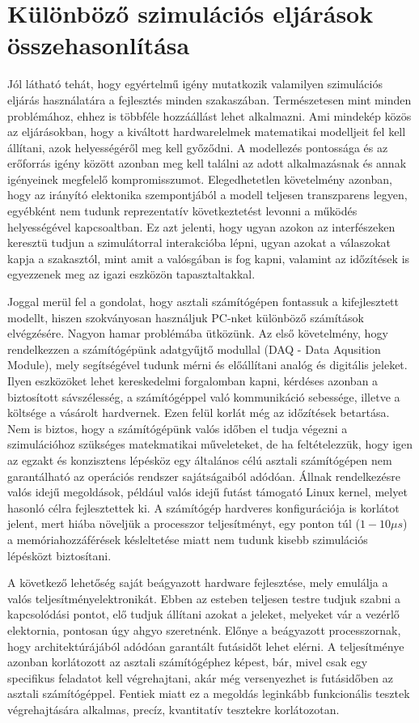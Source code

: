 \section{Különböző szimulációs eljárások összehasonlítása}

Jól látható tehát, hogy egyértelmű igény mutatkozik valamilyen szimulációs eljárás használatára a fejlesztés minden szakaszában. Természetesen mint minden problémához, ehhez is többféle hozzáállást lehet alkalmazni. Ami mindekép közös az eljárásokban, hogy a kiváltott hardwarelelmek matematikai modelljeit fel kell állítani, azok helyességéről meg kell győződni. A modellezés pontossága és az erőforrás igény között azonban meg kell találni az adott alkalmazásnak és annak igényeinek megfelelő kompromisszumot. Elegedhetetlen követelmény azonban, hogy az irányító elektonika szempontjából a modell teljesen transzparens legyen, egyébként nem tudunk reprezentatív következtetést levonni a működés helyességével kapcsoaltban. Ez azt jelenti, hogy ugyan azokon az interfészeken keresztü tudjun a szimulátorral interakcióba lépni, ugyan azokat a válaszokat kapja a szakasztól, mint amit a valósgában is fog kapni, valamint az időzítések is egyezzenek meg az igazi eszközön tapasztaltakkal.

Joggal merül fel a gondolat, hogy asztali számítógépen fontassuk a kifejlesztett modellt, hiszen szokványosan használjuk PC-nket különböző számítások elvégzésére. Nagyon hamar problémába ütközünk. Az első követelmény, hogy rendelkezzen a számítógépünk adatgyűjtő modullal (DAQ - Data Aqusition Module), mely segítségével tudunk mérni és előállítani analóg és digitális jeleket. Ilyen eszközöket lehet kereskedelmi forgalomban kapni, kérdéses azonban a biztosított sávszélesség, a számítógéppel való kommunikáció sebessége, illetve a költsége a vásárolt hardvernek. Ezen felül korlát még az időzítések betartása. Nem is biztos, hogy a számítógépünk valós időben el tudja végezni a szimulációhoz szükséges matekmatikai műveleteket, de ha feltételezzük, hogy igen az egzakt és konzisztens lépésköz egy általános célú asztali számítógépen nem garantálható az operációs rendszer sajátságaiból adódóan. Állnak rendelkezésre valós idejű megoldások, például valós idejű futást támogató Linux kernel, melyet hasonló célra fejlesztettek ki. A számítógép hardveres konfigurációja is korlátot jelent, mert hiába növeljük a processzor teljesítményt, egy ponton túl ($1 - 10 \mu{}s$) a memóriahozzáférések késleltetése miatt nem tudunk kisebb szimulációs lépésközt biztosítani.

A következő lehetőség saját beágyazott hardware fejlesztése, mely emulálja a valós teljesítményelektronikát. Ebben az esteben teljesen testre tudjuk szabni a kapcsolódási pontot, elő tudjuk állítani azokat a jeleket, melyeket vár a vezérlő elektornia, pontosan úgy ahgyo szeretnénk. Előnye a beágyazott processzornak, hogy architektúrájából adódóan garantált futásidőt lehet elérni. A teljesítménye azonban korlátozott az asztali számítógéphez képest, bár, mivel csak egy specifikus feladatot kell végrehajtani, akár még versenyezhet is futásidőben az asztali számítógéppel. Fentiek miatt ez a megoldás leginkább funkcionális tesztek végrehajtására alkalmas, precíz, kvantitatív tesztekre korlátozotan.

